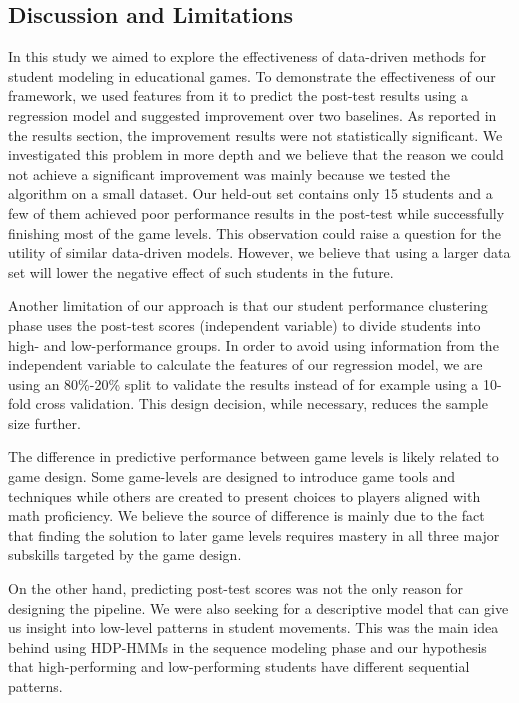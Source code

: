 \documentclass{sigchi}
\begin{document}
	\subsection{Discussion and Limitations}
	
	
	In this study we aimed to explore the effectiveness of data-driven methods for student modeling in educational games. 
	To demonstrate the effectiveness of our framework, we used features from it to predict the post-test results using a regression model and suggested improvement over two  baselines.
	As reported in the results section, the improvement results were not statistically significant. We investigated this problem in more depth and we believe that the reason we could not achieve a significant improvement was mainly because we tested the algorithm on a small dataset.
	Our held-out set contains only 15 students and a few of them achieved poor performance results in the post-test while successfully finishing most of the game levels.
	This observation could raise a question for the utility of similar data-driven models.
	However, we believe that using a larger data set will lower the negative effect of such students in the future.
	
	Another limitation of our approach is that our student performance clustering phase uses the post-test scores (independent variable) to divide students into high- and low-performance groups. 
	In order to avoid using information from the independent variable to calculate the features of our regression model, we are using an 80\%-20\% split to validate the results instead of for example using a 10-fold cross validation.
	This design decision, while necessary, reduces the sample size further.
	
	The difference in predictive performance between game levels is likely related to game design. 
	Some game-levels are designed to introduce game tools and techniques while others are created to present choices to players aligned with math proficiency.
	We believe the source of difference is mainly due to the fact that finding the solution to later game levels requires mastery in all three major subskills targeted by the game design.
	
	On the other hand, predicting post-test scores was not the only reason for designing the pipeline.
	We were also seeking for a descriptive model that can give us insight into low-level patterns in student movements. 
	This was the main idea behind using HDP-HMMs in the sequence modeling phase and our hypothesis that high-performing and low-performing students have different sequential patterns. 
	
\end{document}
